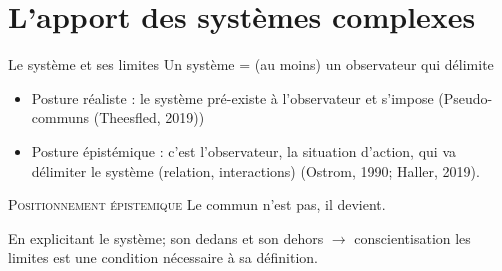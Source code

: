 \documentclass[newPxFont]{beamer}
\begin{document}

\section{L'apport des systèmes complexes}

\begin{frame}[c]{Le système et ses limites}
\vspace{-1cm}
Un système = (au moins) un observateur qui délimite
\begin{itemize}
  \item Posture réaliste : le système pré-existe à l'observateur et s'impose (Pseudo-communs (Theesfled, 2019))
  \item Posture épistémique : c'est l'observateur, la situation d'action, qui va délimiter le système (relation, interactions) (Ostrom, 1990; Haller, 2019).
\end{itemize}

\small{
  \begin{alertblock}{\textsc{Positionnement épistemique}}
      Le commun n'est pas, il devient.
  \end{alertblock}
}

En explicitant le système; son dedans et son dehors $\rightarrow$  conscientisation les limites est une condition nécessaire à sa définition.


\end{frame}
\end{document}
